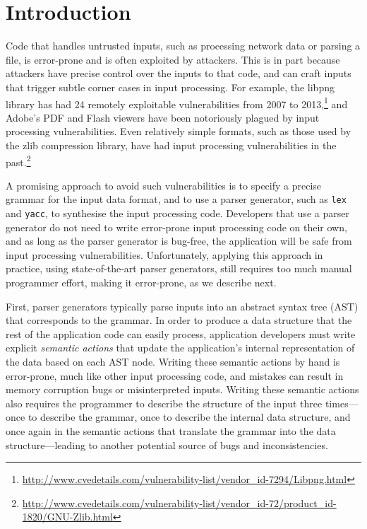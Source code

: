 \section{Introduction}

Code that handles untrusted inputs, such as processing network
data or parsing a file, is error-prone and is often exploited by
attackers.  This is in part because attackers have precise control
over the inputs to that code, and can craft inputs that trigger
subtle corner cases in input processing.  For example, the libpng
library has had 24 remotely exploitable vulnerabilities from 2007 to
2013,\footnote{\url{http://www.cvedetails.com/vulnerability-list/vendor_id-7294/Libpng.html}}
and Adobe's PDF and Flash viewers have been notoriously
plagued by input processing vulnerabilities.  Even relatively
simple formats, such as those used by the zlib compression
library, have had input processing vulnerabilities in the
past.\footnote{\url{http://www.cvedetails.com/vulnerability-list/vendor_id-72/product_id-1820/GNU-Zlib.html}}

A promising approach to avoid such vulnerabilities is to specify
a precise grammar for the input data format, and to use a parser
generator, such as {\tt lex} and {\tt yacc}, to synthesise the input
processing code.  Developers that use a parser generator do not need
to write error-prone input processing code on their own, and as long
as the parser generator is bug-free, the application will be safe from
input processing vulnerabilities.  Unfortunately, applying this approach
in practice, using state-of-the-art parser generators, still requires
too much manual programmer effort, making it error-prone, as we describe
next.

First, parser generators typically parse inputs into an abstract syntax
tree (AST) that corresponds to the grammar.  In order to produce a data
structure that the rest of the application code can easily process,
application developers must write explicit {\em semantic actions} that
update the application's internal representation of the data based on
each AST node.  Writing these semantic actions by hand is error-prone,
much like other input processing code, and mistakes can result in memory
corruption bugs or misinterpreted inputs.  Writing these semantic actions
also requires the programmer to describe the structure of the input three
times---once to describe the grammar, once to describe the internal data
structure, and once again in the semantic actions that translate the
grammar into the data structure---leading to another potential source
of bugs and inconsistencies.


